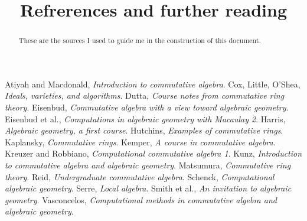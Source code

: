 \documentclass{ximera}
\title{Refrerences and further reading}
\begin{document}
\begin{abstract}
  These are the sources I used to guide me in the construction of this
  document.
\end{abstract}
\maketitle

\begin{thebibliography}{MMMM2002}
   Atiyah and Macdonald, \textit{Introduction to commutative algebra}.
   Cox, Little, O'Shea, \textit{Ideals, varieties, and algorithms}.
   Dutta, \textit{Course notes from commutative ring theory}.
   Eisenbud, \textit{Commutative algebra with a view toward algebraic geometry}.
   Eisenbud et al., \textit{Computations in algebraic geometry with Macaulay 2}.
   Harris, \textit{Algebraic geometry, a first course}.
   Hutchins, \textit{Examples of commutative rings}.
   Kaplansky, \textit{Commutative rings}.
   Kemper, \textit{A course in commutative algebra}.
   Kreuzer and Robbiano, \textit{Computational commutative algebra 1}.
   Kunz, \textit{Introduction to commutative algebra and algebraic geometry}.
   Matsumura, \textit{Commutative ring theory}.
   Reid, \textit{Undergraduate commutative algebra}.
   Schenck, \textit{Computational algebraic geometry}.
   Serre, \textit{Local algebra}.
   Smith et al., \textit{An invitation to algebraic geometry}.
   Vasconcelos, \textit{Computational methods in commutative algebra and algebraic geometry}.
\end{thebibliography}
\end{document}

